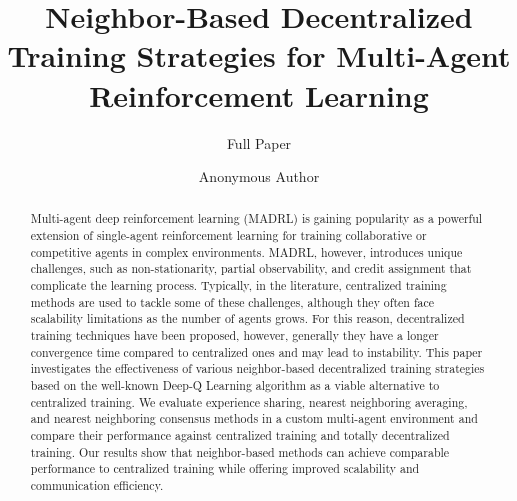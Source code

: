 \documentclass[sigconf]{acmart}
\begin{document}
\title{Neighbor-Based Decentralized Training Strategies for Multi-Agent Reinforcement Learning}
\subtitle{Full Paper}
  
\renewcommand{\shorttitle}{SIG Proceedings Paper in LaTeX Format}





\author{Anonymous Author}
\renewcommand{\shortauthors}{A. Author et al.}

\begin{abstract}
Multi-agent deep reinforcement learning (MADRL) is gaining popularity as a powerful extension of
  single-agent reinforcement learning for training collaborative or competitive agents
  in complex environments. 
%
MADRL, however, introduces unique challenges, such as non-stationarity, partial observability, 
  and credit assignment that complicate the learning process.
%
Typically, in the literature, centralized training methods are used to tackle some of these challenges, 
  although they often face scalability limitations as the number of agents grows.
%
For this reason, decentralized training techniques have been proposed, however, 
  generally they have a longer convergence time compared to centralized ones 
  and may lead to instability.
%
This paper investigates the effectiveness of various neighbor-based decentralized training strategies based 
  on the well-known Deep-Q Learning algorithm as a viable alternative to centralized training. 
%  
We evaluate experience sharing, nearest neighboring averaging, and nearest neighboring consensus methods 
  in a custom multi-agent environment and compare their performance against centralized training
  and totally decentralized training. 
%  
Our results show that neighbor-based methods can achieve comparable performance to centralized training 
  while offering improved scalability and communication efficiency. 
%
\end{abstract}
\end{document}
